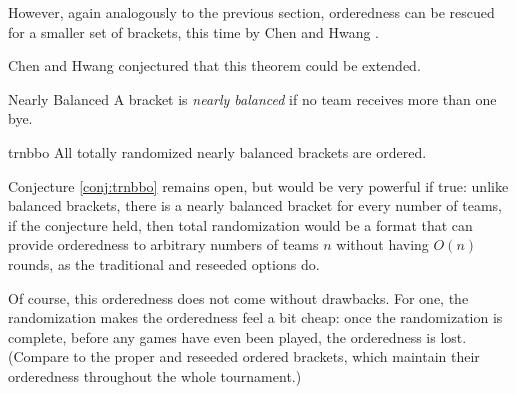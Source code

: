 {{        %

    }{}

    However, again analogously to the previous section, orderedness can be rescued for a smaller set of brackets, this time by Chen and Hwang \cite{totally_random_balanced}.


    Chen and Hwang conjectured that this theorem could be extended.

    \begin{definition}{Nearly Balanced}{}
        A bracket is \textit{nearly balanced} if no team receives more than one bye.
    \end{definition}

    \begin{conj}{}{trnbbo}
        All totally randomized nearly balanced brackets are ordered.
    \end{conj}

    Conjecture \ref{conj:trnbbo} remains open, but would be very powerful if true: unlike balanced brackets, there is a nearly balanced bracket for every number of teams, if the conjecture held, then total randomization would be a format that can provide orderedness to arbitrary numbers of teams $n$ without having $O(n)$ rounds, as the traditional and reseeded options do.

    Of course, this orderedness does not come without drawbacks. For one, the randomization makes the orderedness feel a bit cheap: once the randomization is complete, before any games have even been played, the orderedness is lost. (Compare to the proper and reseeded ordered brackets, which maintain their orderedness throughout the whole tournament.)

}
